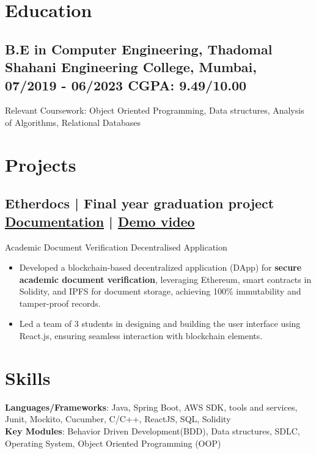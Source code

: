 \documentclass[a4,10pt]{article}
\newcommand{\subtext}[1]{
#1\par\vspace{-0.2cm}}
\newenvironment{zitemize}{
\begin{itemize}\itemsep0pt \parskip0pt \parsep1pt}
{\end{itemize}\vspace{-0.5cm}}
\begin{document}
\section{Education }
\subsection*{B.E in Computer Engineering, {\normalsize \normalfont Thadomal Shahani Engineering College, Mumbai, 07/2019 - 06/2023} \hfill CGPA: 9.49/10.00} 
\subtext{{Relevant Coursework: Object Oriented Programming, Data structures, Analysis of Algorithms, Relational Databases} }


\section{Projects} 

\subsection*{Etherdocs | Final year graduation project \hfill {\href{https://github.com/DevelopersLeague/EtherDocs/blob/main/Readme.md}{Documentation} } | {\href{https://youtu.be/B_44aJ9hh6U?si=dGItpsQ3AEo_eIxk}{Demo video} }
}
\subtext{{\normalsize\normalfont Academic Document Verification Decentralised Application}}
    \begin{zitemize}
        \item Developed a blockchain-based decentralized application (DApp) for \textbf{secure academic document verification}, leveraging Ethereum, smart contracts in Solidity, and IPFS for document storage, achieving 100\% immutability and tamper-proof records.
        \item Led a team of 3 students in designing and building the user interface using React.js, ensuring seamless interaction with blockchain elements.
    \end{zitemize}



\section{Skills}
\textbf{Languages/Frameworks}: Java, Spring Boot, AWS SDK, tools and services, Junit, Mockito, Cucumber, C/C++, ReactJS, SQL, Solidity \\ 
\textbf{Key Modules}: Behavior Driven Development(BDD), Data structures, SDLC, Operating System, Object Oriented Programming (OOP)
\end{document}
